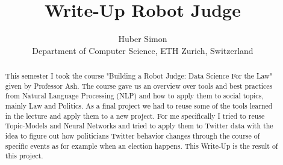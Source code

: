\documentclass[10pt,conference,compsocconf]{IEEEtran}
\begin{document}
\title{Write-Up Robot Judge}

\author{
  Huber Simon\\
  Department of Computer Science, ETH Zurich, Switzerland
}

\maketitle

\begin{abstract}
  This semester I took the course "Building a Robot Judge: Data Science For the Law" given by Professor Ash. The course gave us an overview over tools and best practices from Natural Language Processing (NLP) and how to apply them to social topics, mainly Law and Politics. As a final project we had to reuse some of the tools learned in the lecture and apply them to a new project. For me specifically I tried to reuse Topic-Models and Neural Networks and tried to apply them to Twitter data with the idea to figure out how politicians Twitter behavior changes through the course of specific events as for example when an election happens. This Write-Up is the result of this project. 
  
\end{abstract}
\end{document}
